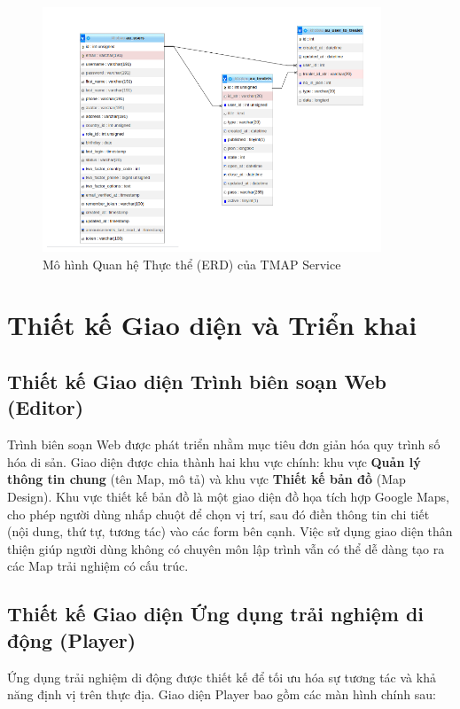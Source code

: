 \begin{figure}[h]
    \centering
    \includegraphics[width=0.9\textwidth]{erd.png}
    \caption{Mô hình Quan hệ Thực thể (ERD) của TMAP Service}
    \label{fig:ERD_TMAP}
\end{figure}

\section{Thiết kế Giao diện và Triển khai}

\subsection{Thiết kế Giao diện Trình biên soạn Web (Editor)}

Trình biên soạn Web được phát triển nhằm mục tiêu đơn giản hóa quy trình số hóa di sản. Giao diện được chia thành hai khu vực chính: khu vực \textbf{Quản lý thông tin chung} (tên Map, mô tả) và khu vực \textbf{Thiết kế bản đồ} (Map Design). Khu vực thiết kế bản đồ là một giao diện đồ họa tích hợp Google Maps, cho phép người dùng nhấp chuột để chọn vị trí, sau đó điền thông tin chi tiết (nội dung, thứ tự, tương tác) vào các form bên cạnh. Việc sử dụng giao diện thân thiện giúp người dùng không có chuyên môn lập trình vẫn có thể dễ dàng tạo ra các Map trải nghiệm có cấu trúc.

\subsection{Thiết kế Giao diện Ứng dụng trải nghiệm di động (Player)}

Ứng dụng trải nghiệm di động được thiết kế để tối ưu hóa sự tương tác và khả năng định vị trên thực địa. Giao diện Player bao gồm các màn hình chính sau:

